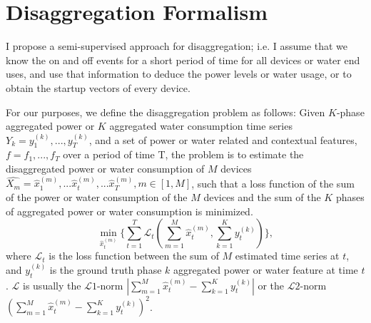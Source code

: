 \section{Disaggregation Formalism}
I propose a semi-supervised approach for disaggregation; i.e.
I assume that we know the on and off events for a short period of time for all devices or water end uses, 
and use that information to deduce the power levels or water usage, 
or to obtain the startup vectors of every device.


For our purposes, we define the disaggregation problem as follows:
Given $K$-phase aggregated power 
or $K$ aggregated water consumption time series 
$Y_k=y_1^{(k)}, ..., y_T^{(k)}$, and a set of
power or water related and contextual features, $f=f_1, ..., f_T$ over a period of time T, 
the problem is to estimate the disaggregated power or water consumption of $M$ devices 
$\hat{X_m }= \hat{x}_{1}^{(m)}, ...\hat{x}_{t}^{(m)}, ... \hat{x}_{T}^{(m)}, m\in[1, M]$, 
such that a loss function of the sum of the power or water consumption of the $M$
devices and the sum of the $K$ phases of aggregated power or water consumption is minimized. 
\begin{equation}
\label{eq_powerObj}
\min_{\hat{x}_{t}^{(m)}} \{ \sum_{t=1}^T \mathscr{L}_t(\sum_{m=1}^M \hat{x}_{t}^{(m)}, \sum_{k=1}^Ky_t^{(k)}) \},
\end{equation}
where $\mathscr{L}_t$ is the loss function between 
the sum of $M$ estimated time series at $t$, 
and $y_t^{(k)}$ is the ground truth phase $k$ aggregated power or water feature at time $t$. 
$\mathscr{L}$ is usually the $\mathscr{L}1$-norm $|\sum_{m=1}^M \hat{x}_{t}^{(m)} -\sum_{k=1}^K y_t^{(k)}|$
or the $\mathscr{L}2$-norm $(\sum_{m=1}^M \hat{x}_{t}^{(m)}-\sum_{k=1}^Ky_t^{(k)})^2$.


